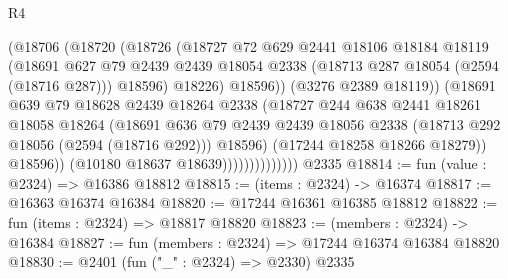 \begin{lexlean}{R4}
\begin{coremodule}
                                (@18706
                                  (@18720
                                    (@18726
                                      (@18727
                                        @72
                                        @629
                                        @2441
                                        @18106
                                        @18184
                                        @18119
                                        (@18691
                                          @627
                                          @79
                                          @2439
                                          @2439
                                          @18054
                                          @2338
                                          (@18713 @287 @18054 (@2594 (@18716 @287)))
                                          @18596)
                                        @18226)
                                      @18596))
                                  (@3276 @2389 @18119))
                                (@18691
                                  @639
                                  @79
                                  @18628
                                  @2439
                                  @18264
                                  @2338
                                  (@18727
                                    @244
                                    @638
                                    @2441
                                    @18261
                                    @18058
                                    @18264
                                    (@18691
                                      @636
                                      @79
                                      @2439
                                      @2439
                                      @18056
                                      @2338
                                      (@18713 @292 @18056 (@2594 (@18716 @292)))
                                      @18596)
                                    (@17244 @18258 @18266 @18279))
                                  @18596))
                              (@10180 @18637 @18639))))))))))))))
    @2335
@18814 := fun (value : @2324) => @16386 @18812
@18815 := (items : @2324) -> @16374
@18817 := @16363 @16374 @16384
@18820 := @17244 @16361 @16385 @18812
@18822 := fun (items : @2324) => @18817 @18820
@18823 := (members : @2324) -> @16384
@18827 := fun (members : @2324) => @17244 @16374 @16384 @18820
@18830 := @2401 (fun ("_" : @2324) => @2330) @2335

\end{coremodule}
\end{lexlean}
